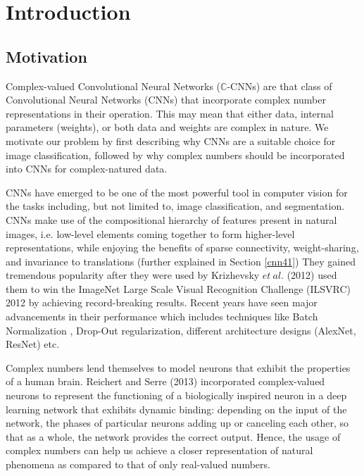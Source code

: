 \chapter{Introduction} \label{chap:intro}

\section{Motivation} \label{sect:moti}

Complex-valued Convolutional Neural Networks ($\mathbb{C}$-CNNs) are that class of Convolutional Neural Networks (CNNs) that incorporate complex number representations in their operation. This may mean that either data, internal parameters (weights), or both data and weights are complex in nature. We motivate our problem by first describing why CNNs are a suitable choice for image classification, followed by why complex numbers should be incorporated into CNNs for complex-natured data.

CNNs have emerged to be one of the most powerful tool in computer vision for the tasks including, but not limited to, image classification, and segmentation. CNNs make use of the compositional hierarchy of features present in natural images, i.e. low-level elements coming together to form higher-level representations, while enjoying the benefits of sparse connectivity, weight-sharing, and invariance to translations (further explained in Section \ref{cnn41})  They gained tremendous popularity after they were used by Krizhevsky $et \ al.$ (2012) \cite{krizhevsky2012imagenet} used them to win the ImageNet Large Scale Visual Recognition Challenge (ILSVRC) 2012 by achieving record-breaking results. Recent years have seen major advancements in their performance which includes techniques like Batch Normalization \cite{bnIoffeS15}, Drop-Out regularization, different architecture designs (AlexNet, ResNet) etc.

Complex numbers lend themselves to model neurons that exhibit the properties of a human brain. Reichert and Serre (2013) \cite{reichert2013neuronal} incorporated complex-valued neurons to represent the functioning of a biologically inspired neuron in a deep learning network that exhibits dynamic binding: depending on the input of the network, the phases of particular neurons adding up or canceling each other, so that as a whole, the network provides the correct output. Hence, the usage of complex numbers can help us achieve a closer representation of natural phenomena as compared to that of only real-valued numbers.


